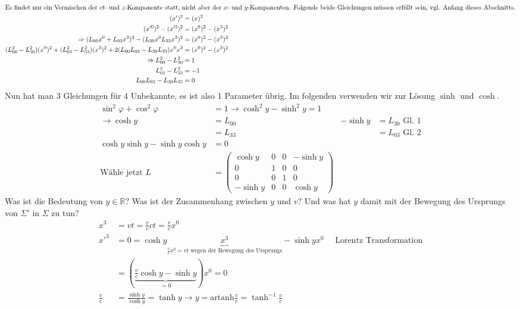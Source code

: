 \documentclass[oneside]{book}
\theoremstyle{definition}
\newcommand{\vp}{\varphi}
\renewcommand{\Re}{\mathbb{R}}
\begin{document}
\begin{align*}
\intertext{Es findet nur ein Vermischen der $ct$- und $z$-Komponente statt, nicht aber der $x$- und $y$-Komponenten. Folgende beide Gleichungen müssen erfüllt sein, vgl. Anfang dieses Abschnitts.}
(x')^2 &= (x)^2\\
(x'^0)^2 - (x'^3)^2 &= (x^0)^2 - (x^3)^2\\
\Rightarrow (L_{00}x^0 + L_{03}x^3)^2 - (L_{30} x^0 L_{33}x^3)^2 &= (x^0)^2 - (x^3)^2\\
(L_{00}^2-L_{30}^2)(x^0)^2 + (L_{03}^2 - L_{33}^2)(x^3)^2 + 2(L_{00}L_{03} - L_{30} L_{33})x^0 x^3 &= (x^0)^2 - (x^3)^2\\
\Rightarrow L_{00}^2 - L_{30}^2 &= 1\\
L_{03}^2 - L_{33}^2 &= -1\\
L_{00}L_{03} - L_{30}L_{33} &= 0
\end{align*}
Nun hat man 3 Gleichungen für 4 Unbekannte, es ist also 1 Parameter übrig. Im folgenden verwenden wir zur Lösung $\sinh$ und $\cosh$.
\begin{align*}
\sin^2 \vp + \cos^2\vp &= 1 \rightarrow \cosh^2 y - \sinh^2 y = 1\\
\rightarrow \cosh y &= L_{00}  & -\sinh y &= L_{30} \text{~Gl. 1}\\
&= L_{33} &  &= L_{03} \text{~Gl. 2}\\
\cosh y \sinh y - \sinh y \cosh y &= 0\\
\text{Wähle jetzt~}
L &= \begin{pmatrix}
\cosh y & 0 & 0 & - \sinh y\\
0 & 1 & 0 & 0\\
0 & 0 & 1 & 0\\
-\sinh y & 0 & 0 & \cosh y 
\end{pmatrix}
\end{align*}
Was ist die Bedeutung von $y \in \Re$? Was ist der Zusammenhang zwischen $y$ und $v$? Und was hat $y$ damit mit der Bewegung des Ursprungs von $\Sigma'$ in $\Sigma$ zu tun?
\begin{align*}
x^3 &= v t = \frac{v}{c} c t = \frac{v}{c} x^0\\
x'^3 &= 0 = \cosh y \underbrace{x^3}_{\frac{v}{c} x^0 = v t \text{~wegen der Bewegung des Ursprungs}} - \sinh y x^0 \text{~~~~Lorentz Transformation}\\
&= (\underbrace{\frac{v}{c} \cosh y - \sinh y}_{=0})x^0 = 0\\
\frac{v}{c} &= \frac{\sinh y}{\cosh y} = \tanh y \rightarrow y = \text{artanh}\frac{v}{c} = \tanh^{-1} \frac{v}{c}
\end{align*}
\end{document}
